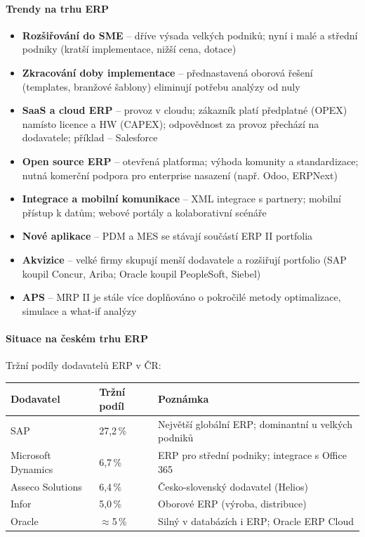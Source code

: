 \paragraph{Trendy na trhu ERP}
\begin{itemize}
  \item \textbf{Rozšiřování do SME} -- dříve výsada velkých podniků; nyní i malé a střední podniky
    (kratší implementace, nižší cena, dotace)
  \item \textbf{Zkracování doby implementace} -- přednastavená oborová řešení (templates, branžové
    šablony) eliminují potřebu analýzy od nuly
  \item \textbf{SaaS a cloud ERP} -- provoz v cloudu; zákazník platí předplatné (OPEX) namísto
    licence a HW (CAPEX); odpovědnost za provoz přechází na dodavatele; příklad -- Salesforce
  \item \textbf{Open source ERP} -- otevřená platforma; výhoda komunity a standardizace; nutná
    komerční podpora pro enterprise nasazení (např. Odoo, ERPNext)
  \item \textbf{Integrace a mobilní komunikace} -- XML integrace s partnery; mobilní přístup k datům;
    webové portály a kolaborativní scénáře
  \item \textbf{Nové aplikace} -- PDM a MES se stávají součástí ERP II portfolia
  \item \textbf{Akvizice} -- velké firmy skupují menší dodavatele a rozšiřují portfolio
    (SAP koupil Concur, Ariba; Oracle koupil PeopleSoft, Siebel)
  \item \textbf{APS} -- MRP II je stále více doplňováno o pokročilé metody optimalizace,
    simulace a what-if analýzy
\end{itemize}

\paragraph{Situace na českém trhu ERP}
Tržní podíly dodavatelů ERP v ČR:

\begin{center}
\begin{tabular}{llp{6cm}}
\toprule
\textbf{Dodavatel} & \textbf{Tržní podíl} & \textbf{Poznámka} \\
\midrule
SAP & 27{,}2\,\% & Největší globální ERP; dominantní u velkých podniků \\
Microsoft Dynamics & 6{,}7\,\% & ERP pro střední podniky; integrace s Office 365 \\
Asseco Solutions & 6{,}4\,\% & Česko-slovenský dodavatel (Helios) \\
Infor & 5{,}0\,\% & Oborové ERP (výroba, distribuce) \\
Oracle & $\approx$5\,\% & Silný v databázích i ERP; Oracle ERP Cloud \\
\bottomrule
\end{tabular}
\end{center}


